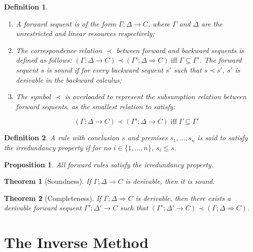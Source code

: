 \documentclass{article}
\newtheorem{theorem}{Theorem}
\newtheorem{definition}{Definition}
\newtheorem{proposition}{Proposition}
\begin{document}
\begin{definition}
  \begin{enumerate}
  \item A forward sequent is of the form $\Gamma; \Delta
    \longrightarrow C$, where $\Gamma$ and $\Delta$ are the
    unrestricted and linear resources respectively;
  \item The correspondence relation $\prec$ between forward and
    backward sequents is defined as follows:
    $(\Gamma; \Delta \longrightarrow C) \prec
    (\Gamma';\Delta\Longrightarrow C) \; \text{iff} \; \Gamma \subseteq
    \Gamma'$. The forward sequent $s$ is sound if for every backward
    sequent $s'$ such that $s \prec s'$, $s'$ is derivable in the
    backward calculus;
  \item The symbol $\prec$ is overloaded to represent the \emph{subsumption}
    relation between forward sequents, as the smallest relation to satisfy:

    \[
      (\Gamma; \Delta \longrightarrow C) \prec (\Gamma'; \Delta
      \longrightarrow C) \; \text{iff} \; \Gamma \subseteq \Gamma'
    \]
  \end{enumerate}
\end{definition}

\begin{definition}
  A rule with conclusion $s$ and premises $s_1, \dots, s_n$ is said to
  satisfy the irredundancy property if for no $i \in \{1, \dots, n\}$,
  $s_i \leq s$.
\end{definition}

\begin{proposition}
  All forward rules satisfy the irredundancy property.
\end{proposition}

\begin{theorem}[Soundness]
  If $\Gamma; \Delta \longrightarrow C$ is derivable, then it is
  sound.
\end{theorem}

\begin{theorem}[Completeness]
  If $\Gamma; \Delta \Longrightarrow C$ is derivable, then there
  exists a derivable forward sequent
  $\Gamma'; \Delta' \longrightarrow C$ such that
  $(\Gamma'; \Delta' \longrightarrow C) \prec (\Gamma; \Delta
  \Longrightarrow C)$.
\end{theorem}

\section{The Inverse Method}
\end{document}
